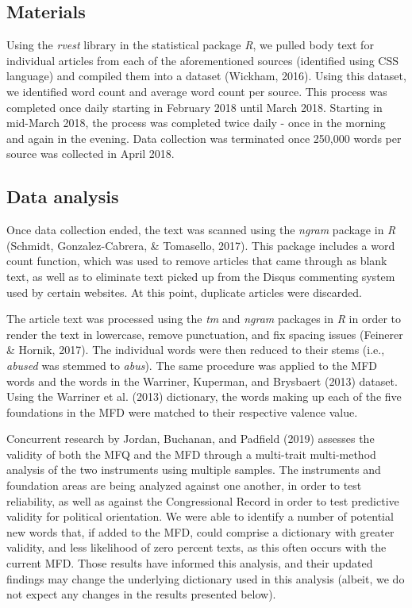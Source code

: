 \documentclass[
  man,floatsintext]{apa6}
\begin{document}
\hypertarget{materials}{%
\subsection{Materials}\label{materials}}

Using the \emph{rvest} library in the statistical package \emph{R}, we pulled body text for individual articles from each of the aforementioned sources (identified using CSS language) and compiled them into a dataset (Wickham, 2016). Using this dataset, we identified word count and average word count per source. This process was completed once daily starting in February 2018 until March 2018. Starting in mid-March 2018, the process was completed twice daily - once in the morning and again in the evening. Data collection was terminated once 250,000 words per source was collected in April 2018.

\hypertarget{data-analysis}{%
\subsection{Data analysis}\label{data-analysis}}

Once data collection ended, the text was scanned using the \emph{ngram} package in \emph{R} (Schmidt, Gonzalez-Cabrera, \& Tomasello, 2017). This package includes a word count function, which was used to remove articles that came through as blank text, as well as to eliminate text picked up from the Disqus commenting system used by certain websites. At this point, duplicate articles were discarded.

The article text was processed using the \emph{tm} and \emph{ngram} packages in \emph{R} in order to render the text in lowercase, remove punctuation, and fix spacing issues (Feinerer \& Hornik, 2017). The individual words were then reduced to their stems (i.e., \emph{abused} was stemmed to \emph{abus}). The same procedure was applied to the MFD words and the words in the Warriner, Kuperman, and Brysbaert (2013) dataset. Using the Warriner et al. (2013) dictionary, the words making up each of the five foundations in the MFD were matched to their respective valence value.

Concurrent research by Jordan, Buchanan, and Padfield (2019) assesses the validity of both the MFQ and the MFD through a multi-trait multi-method analysis of the two instruments using multiple samples. The instruments and foundation areas are being analyzed against one another, in order to test reliability, as well as against the Congressional Record in order to test predictive validity for political orientation. We were able to identify a number of potential new words that, if added to the MFD, could comprise a dictionary with greater validity, and less likelihood of zero percent texts, as this often occurs with the current MFD. Those results have informed this analysis, and their updated findings may change the underlying dictionary used in this analysis (albeit, we do not expect any changes in the results presented below).
\end{document}
